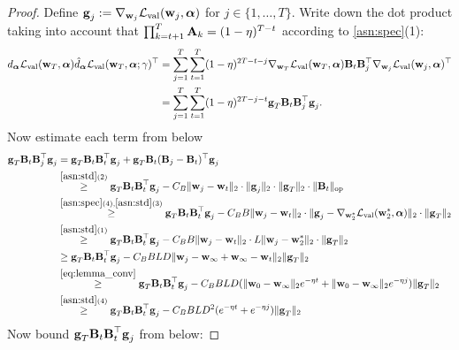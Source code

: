 \begin{proof}
Define $\vect{g}_j := \nabla_{\vect{w}_j}\lval(\vect{w}_j, \vect{\alpha})$ for $j \in \{1, \ldots, T\}$.
    Write down the dot product taking into account that $\prod_{k=t+1}^{T}\vect{A}_k = (1 - \eta)^{T-t}$ according to \ref{asn:spec}(1):
    \begin{align*}
         d_{\vect{\alpha}}\lval(\vect{w}_T, \vect{\alpha}) \hat{d}_{\vect{\alpha}}\lval(\vect{w}_T, \vect{\alpha}; \gamma)^\top &= 
         \sum_{j=1}^T\sum_{t=1}^T (1 - \eta)^{2T - t - j}\nabla_{\vect{w}_T}\lval(\vect{w}_T, \vect{\alpha})\vect{B}_t\vect{B}_j^\top\nabla_{\vect{w}_j}\lval(\vect{w}_j, \vect{\alpha})^\top \\
        &= \sum_{j=1}^T\sum_{t=1}^T(1 - \eta)^{2T - j - t}\vect{g}_T\vect{B}_t\vect{B}_j^\top\vect{g}_j.
    \end{align*}
    Now estimate each term from below
    \begin{align*}
        \vect{g}_T\vect{B}_t\vect{B}_j^\top\vect{g}_j &= \vect{g}_T\vect{B}_t\vect{B}_t^\top\vect{g}_j + \vect{g}_T\vect{B}_t(\vect{B}_j - \vect{B}_t)^\top\vect{g}_j \\
        &\stackrel{\ref{asn:std}(2)}{\geq} \vect{g}_T\vect{B}_t\vect{B}_t^\top\vect{g}_j - C_B\|\vect{w}_j - \vect{w}_t\|_2\cdot\|\vect{g}_j\|_2\cdot\|\vect{g}_T\|_2\cdot\|\vect{B}_t\|_\text{op} \\
        &\stackrel{\ref{asn:spec}(4), \ref{asn:std}(3)}{\geq} \vect{g}_T\vect{B}_t\vect{B}_t^\top\vect{g}_j  - C_BB\|\vect{w}_j - \vect{w}_t\|_2\cdot\|\vect{g}_j - \nabla_{\vect{w}_2^*}\lval(\vect{w}_2^*, \vect{\alpha})\|_2\cdot \|\vect{g}_T\|_2 \\
        &\stackrel{\ref{asn:std}(1)}{\geq} \vect{g}_T\vect{B}_t\vect{B}_t^\top\vect{g}_j  - C_BB\|\vect{w}_j - \vect{w}_t\|_2\cdot L\|\vect{w}_j - \vect{w}_2^*\|_2\cdot \|\vect{g}_T\|_2 \\
        &\geq \vect{g}_T\vect{B}_t\vect{B}_t^\top\vect{g}_j  - C_BBLD\|\vect{w}_j - \vect{w}_\infty + \vect{w}_\infty - \vect{w}_t\|_2\|\vect{g}_T\|_2 \\
        &\stackrel{\eqref{eq:lemma_conv}}{\geq} \vect{g}_T\vect{B}_t\vect{B}_t^\top\vect{g}_j  - C_BBLD(\|\vect{w}_0 - \vect{w}_\infty\|_2e^{-\eta t} + \|\vect{w}_0 - \vect{w}_\infty\|_2e^{-\eta j})\|\vect{g}_T\|_2 \\
        &\stackrel{\ref{asn:std}(4)}{\geq}\vect{g}_T\vect{B}_t\vect{B}_t^\top\vect{g}_j  - C_BBLD^2(e^{-\eta t} + e^{-\eta j})\|\vect{g}_T\|_2 
    \end{align*}
    Now bound $\vect{g}_T\vect{B}_t\vect{B}_t^\top\vect{g}_j$ from below:

\end{proof}
